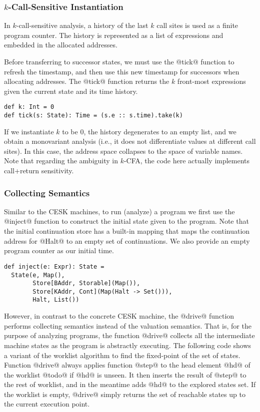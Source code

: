 \documentclass[acmsmall,review,anonymous]{acmart}\settopmatter{printfolios=true,printccs=false,printacmref=false}
\begin{document}
\subsubsection{$k$-Call-Sensitive Instantiation} \label{kcfainst}

In $k$-call-sensitive analysis, a history of the last $k$ call sites is
used as a finite program counter.
The history is represented as a list of expressions and embedded
in the allocated addresses.

Before transferring to successor states, we must use the @tick@ function to
refresh the timestamp, and then use this new timestamp for successors when allocating addresses.
The @tick@ function returns the $k$ front-most expressions given the current state and its
time history.

\begin{lstlisting}
def k: Int = 0
def tick(s: State): Time = (s.e :: s.time).take(k)
\end{lstlisting}

If we instantiate $k$ to be $0$, the history degenerates to an empty list,
and we obtain a monovariant analysis (i.e., it does
not differentiate values at different call sites). In this case, the address
space collapses to the space of variable names.
Note that regarding the ambiguity in $k$-CFA\cite{Gilray:2016:ACP:2951913.2951936},
the code here actually implements call+return sensitivity.

\subsubsection{Collecting Semantics}

Similar to the CESK machines, to run (analyze) a program
we first use the @inject@ function to construct the initial state given to the program.
Note that the initial continuation store has a built-in mapping that maps the continuation
address for @Halt@ to an empty set of continuations.
We also provide an empty program counter as our initial time.
\begin{lstlisting}
def inject(e: Expr): State =
  State(e, Map(),
        Store[BAddr, Storable](Map()),
        Store[KAddr, Cont](Map(Halt -> Set())),
        Halt, List())
\end{lstlisting}

However, in contrast to the concrete CESK machine, the
@drive@ function performs collecting semantics instead of the valuation
semantics. That is, for the purpose of analyzing programs, the function @drive@
collects all the intermediate machine states as the program is abstractly executing.
The following code shows a variant of the worklist algorithm to find the fixed-point
of the set of states.
Function @drive@ always applies function @step@ to the head element @hd@ of
the worklist @todo@ if @hd@ is unseen. It then inserts the result of @step@ to
the rest of worklist, and in the meantime adds @hd@ to the explored states set.
If the worklist is empty, @drive@ simply returns the set of reachable states
up to the current execution point.
\end{document}
